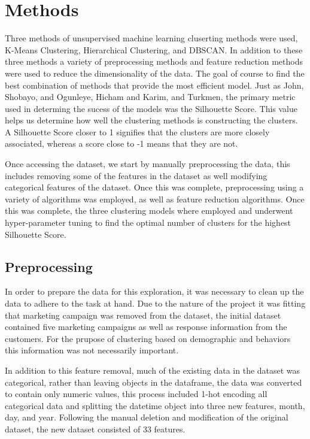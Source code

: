 \documentclass[twocolumn]{article}
\begin{document}
\section{Methods}

Three methods of unsupervised machine learning cluserting methods were used, K-Means Clustering, Hierarchical Clustering, and DBSCAN. In addition to these three methods a variety of preprocessing methods and feature reduction methods were used to reduce the dimensionality of the data. The goal of course to find the best combination of methods that provide the most efficient model. Just as John, Shobayo, and Ogunleye\cite{john}, Hicham and Karim\cite{hicham}, and Turkmen\cite{turkmen}, the primary metric used in determing the sucess of the models was the Silhouette Score. This value helps us determine how well the clustering methods is constructing the clusters. A Silhouette Score closer to 1 signifies that the clusters are more closely associated, whereas a score close to -1 means that they are not.

Once accessing the dataset, we start by manually preprocessing the data, this includes removing some of the features in the dataset as well modifying categorical features of the dataset. Once this was complete, preprocessing using a variety of algorithms was employed, as well as feature reduction algorithms. Once this was complete, the three clustering models where employed and underwent hyper-parameter tuning to find the optimal number of clusters for the highest Silhouette Score.


\subsection{Preprocessing}

In order to prepare the data for this exploration, it was necessary to clean up the data to adhere to the task at hand.
Due to the nature of the project it was fitting that marketing campaign was removed from the dataset, the initial dataset contained five marketing campaigns as well as response information from the customers. For the prupose of clustering based on demographic and behaviors this information was not necessarily important.
 
In addition to this feature removal, much of the existing data in the dataset was categorical, rather than leaving objects
in the dataframe, the data was converted to contain only numeric values, this process included 1-hot encoding all categorical
data and splitting the datetime object into three new features, month, day, and year. Following the manual deletion and modification of the original dataset, the new dataset consisted of 33 features.
\end{document}
